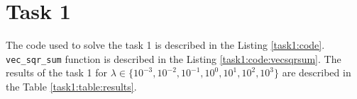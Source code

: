 \section{Task 1}

The code used to solve the task 1 is described in the Listing \ref{task1:code}. \lstinline{vec_sqr_sum} function is described in the Listing \ref{task1:code:vecsqrsum}. The results of the task 1 for $\lambda \in \{ 10^{-3}, 10^{-2}, 10^{-1}, 10^0, 10^1, 10^2, 10^3 \}$ are described in the Table \ref{task1:table:results}.

